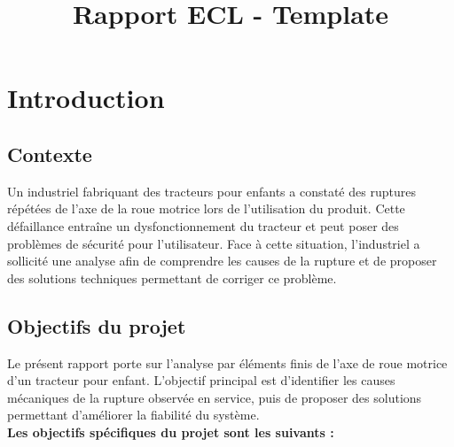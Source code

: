 \documentclass{rapportECL}
\title{Rapport ECL - Template} %
\begin{document}





        
\fairemarges %
\fairepagedegarde %
\tabledematieres %


\section{Introduction}

\subsection{Contexte}

Un industriel fabriquant des tracteurs pour enfants a constaté des ruptures répétées de l’axe de la roue motrice lors de l’utilisation du produit. Cette défaillance entraîne un dysfonctionnement du tracteur et peut poser des problèmes de sécurité pour l’utilisateur. Face à cette situation, l’industriel a sollicité une analyse afin de comprendre les causes de la rupture et de proposer des solutions techniques permettant de corriger ce problème.

\subsection{Objectifs du projet}

Le présent rapport porte sur l’analyse par éléments finis de l’axe de roue motrice d’un tracteur pour enfant. L’objectif principal est d’identifier les causes mécaniques de la rupture observée en service, puis de proposer des solutions permettant d’améliorer la fiabilité du système.
\\
\textbf{Les objectifs spécifiques du projet sont les suivants :}
\end{document}

